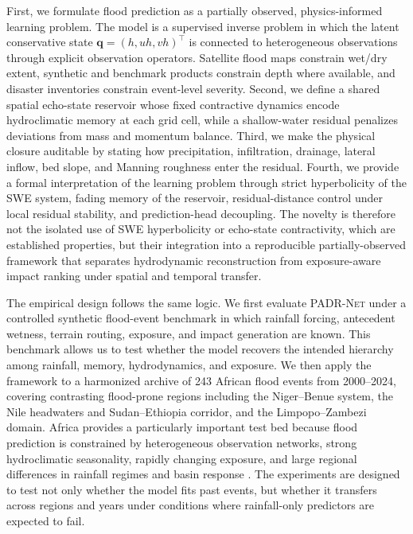 \documentclass[pdflatex,sn-mathphys-ay]{sn-jnl}
\theoremstyle{thmstyleone}
\begin{document}
First, we formulate flood prediction as a partially observed, physics-informed learning problem.  The model is a
supervised inverse problem in which the latent conservative state
$\mathbf{q}=(h,uh,vh)^\top$ is connected to heterogeneous observations
through explicit observation operators.  Satellite flood maps constrain
wet/dry extent, synthetic and benchmark products constrain depth where
available, and disaster inventories constrain event-level severity.
Second, we define a shared spatial echo-state reservoir whose fixed
contractive dynamics encode hydroclimatic memory at each grid cell,
while a shallow-water residual penalizes deviations from mass and
momentum balance.  Third, we make the physical closure auditable by
stating how precipitation, infiltration, drainage, lateral inflow, bed
slope, and Manning roughness enter the residual.  Fourth, we provide a
formal interpretation of the learning problem through strict
hyperbolicity of the SWE system, fading memory of the reservoir,
residual-distance control under local residual stability, and
prediction-head decoupling.  The novelty is therefore not the isolated
use of SWE hyperbolicity or echo-state contractivity, which are
established properties, but their integration into a
reproducible partially-observed framework that separates hydrodynamic
reconstruction from exposure-aware impact ranking under spatial and
temporal transfer.

The empirical design follows the same logic.  We first evaluate
\textsc{PADR-Net} under a controlled synthetic flood-event benchmark in
which rainfall forcing, antecedent wetness, terrain routing, exposure,
and impact generation are known.  This benchmark allows us to test
whether the model recovers the intended hierarchy among rainfall,
memory, hydrodynamics, and exposure.  We then apply the framework to a
harmonized archive of 243 African flood events from 2000--2024,
covering contrasting flood-prone regions including the Niger--Benue
system, the Nile headwaters and Sudan--Ethiopia corridor, and the
Limpopo--Zambezi domain.  Africa provides a particularly important
test bed because flood prediction is constrained by heterogeneous
observation networks, strong hydroclimatic seasonality, rapidly
changing exposure, and large regional differences in rainfall regimes
and basin response
\citep{DiBaldassarre2010,Thiemig2015,Nikulin2012,Dosio2017,Bodian2018,Dembele2020}.
The experiments are designed to test not only whether the model fits
past events, but whether it transfers across regions and years under
conditions where rainfall-only predictors are expected to fail.
\end{document}
